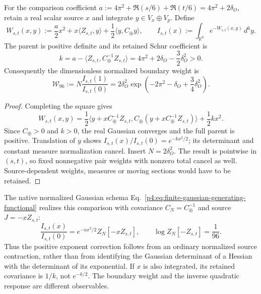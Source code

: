 \documentclass[11pt,a4paper]{article}
\begin{document}
\begin{corollary}
\label{p3g:cor:v252-gaussian-boundary-weight}
For the comparison coefficient
\(a:=4\pi^2+\Re(s/6)+\Re(t/6)=4\pi^2+2\delta_O\), retain a real scalar
source \(x\) and integrate \(y\in V_x\oplus V_p\). Define
\begin{equation}
\label{p3g:eq:v252-comparison-parent}
 W_{s,t}(x,y):=\frac a2x^2+x\langle Z_{s,t},y\rangle
              +\frac12\langle y,C_\oplus y\rangle,\qquad
 I_{s,t}(x):=\int_{\mathbb R^6}e^{-W_{s,t}(x,y)}\,d^6y.
\end{equation}
The parent is positive definite and its retained Schur coefficient is
\begin{equation}
\label{p3g:eq:v252-scalar-schur-96}
 k=a-\langle Z_{s,t},C_\oplus^{-1}Z_{s,t}\rangle
   =4\pi^2+2\delta_O-\frac32\delta_O^2>0.
\end{equation}
Consequently the dimensionless normalized boundary weight is
\begin{equation}
\label{p3g:eq:v252-gaussian-weight-96}
 \boxed{\mathcal W_{96}:=N\frac{I_{s,t}(1)}{I_{s,t}(0)}
 =2\delta_O^2\exp\!\left(-2\pi^2-\delta_O+
                                      \frac34\delta_O^2\right).}
\end{equation}
\end{corollary}
\begin{proof}
Completing the square gives
\[
 W_{s,t}(x,y)=\frac12\langle y+xC_\oplus^{-1}Z_{s,t},
             C_\oplus(y+xC_\oplus^{-1}Z_{s,t})\rangle
             +\frac12kx^2.
\]
Since \(C_\oplus>0\) and \(k>0\), the real Gaussian converges and the full
parent is positive. Translation of \(y\) shows
\(I_{s,t}(x)/I_{s,t}(0)=e^{-kx^2/2}\); its determinant and constant measure
normalization cancel. Insert \(N=2\delta_O^2\). The result is pointwise in
\((s,t)\), so fixed nonnegative pair weights with nonzero total cancel as well. Source-dependent weights,
measures or moving sections would have to be retained.
\end{proof}

The native normalized Gaussian schema
Eq.~\eqref{p4:eq:finite-gaussian-generating-functional} realizes this
comparison with covariance \(C_N=C_\oplus^{-1}\) and source
\(J=-xZ_{s,t}\):
\[
 \frac{I_{s,t}(x)}{I_{s,t}(0)}=e^{-ax^2/2}Z_N[-xZ_{s,t}],\qquad
 \log Z_N[-Z_{s,t}]=\frac1{96}.
\]
Thus the positive exponent correction follows from an ordinary normalized
source contraction, rather than from identifying the Gaussian determinant
of a Hessian with the determinant of its exponential. If \(x\) is also
integrated, its retained covariance is \(1/k\), not \(e^{-k/2}\). The
boundary weight and the inverse quadratic response are different observables.
\end{document}
